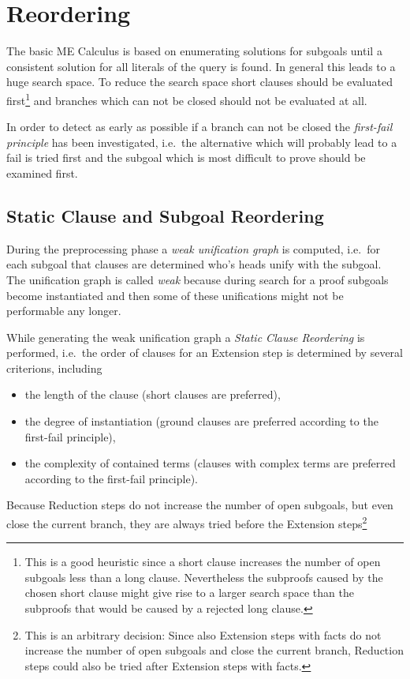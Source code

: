 \section{Reordering}

The basic ME Calculus is based on enumerating solutions for subgoals
until a consistent solution for all literals of the query is found. In
general this leads to a huge search space. To reduce the search space
short clauses should be evaluated first\footnote{This is a good
	heuristic since a short clause increases the number of open
	subgoals less than a long clause. Nevertheless the subproofs
	caused by the chosen short clause might give rise to a larger
	search space than the subproofs that would be caused by a
	rejected long clause.} 
and branches which can not be closed should not be evaluated at all.
 
In order to detect as early as possible if a branch can not be closed
the {\em first-fail principle\/} has been investigated, i.e.\ the
alternative which will probably lead to a fail is tried first and the
subgoal which is most difficult to prove should be examined first.


\subsection{Static Clause and Subgoal Reordering}

During the preprocessing phase a {\em weak unification graph\/} is
computed, i.e.\ for each subgoal that clauses are determined who's
heads unify with the subgoal. The unification graph is called {\em
weak\/} because during search for a proof subgoals become
instantiated and then some of these unifications might not be
performable any longer.

While generating the weak unification graph a {\em Static Clause
Reordering\/} is performed, i.e.\ the order of clauses for an
Extension step is determined by several criterions, including 
\begin{itemize}
\item the length of the clause (short clauses are preferred),
\item the degree of instantiation (ground clauses are preferred
	according to the first-fail principle),
\item the complexity of contained terms (clauses with complex
      terms are preferred according to the first-fail principle).  
\end{itemize}
Because Reduction steps do not increase the number of open subgoals,
but even close the current branch, they are always tried before the
Extension steps\footnote{This is an arbitrary decision: Since also
Extension steps with facts do not increase the number of open subgoals
and close the current branch, Reduction steps could also be tried
after Extension steps with facts.}


